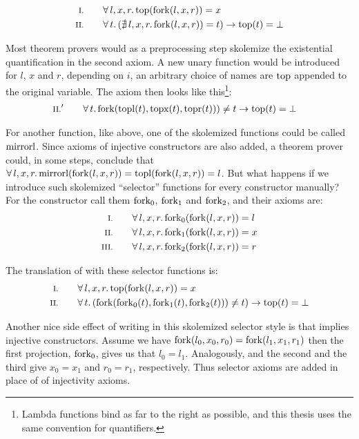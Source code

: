 \begin{align*}
\rom{1} \qquad & \faaa{l}{x}{r} \fn{top}(\fn{fork}(l,x,r)) \eq x \\
\rom{2} \qquad & \fa{t}         (\nexxx{l}{x}{r} \fn{fork}(l,x,r)) \eq t) \rightarrow \fn{top}(t) \eq \bot
\end{align*}

Most theorem provers would as a preprocessing step skolemize the existential quantification in the second
axiom. A new unary function would be introduced for $l$, $x$ and $r$,
depending on $i$, an arbitrary choice of names are $\mathrm{top}$ appended
to the original variable. The axiom then looks like
this\footnote{Lambda functions bind as far to the right as possible,
  and this thesis uses the same convention for quantifiers.}:
\begin{align*}
\rom{2}' \qquad & \fa{t} \fn{fork}(\fn{topl}(t),\fn{topx}(t),\fn{topr}(t))) \neq t \rightarrow \fn{top}(t) \eq \bot
\end{align*}

For another function, like  above, one of the skolemized
functions could be called $\mathrm{mirrorl}$. Since axioms of injective
constructors are also added, a theorem prover could, in some steps,
conclude that $\forall \, l , x , r . \, \mathrm{mirrorl}(\mathrm{fork}(l,x,r)) =
\mathrm{topl}(\mathrm{fork}(l,x,r)) = l$. But what happens if we introduce
such skolemized ``selector'' functions for every constructor manually?
For the  constructor call them $\mathrm{fork_0}$, $\mathrm{fork_1}$
and $\mathrm{fork_2}$, and their axioms are:
\begin{align*}
\rom{1} \qquad \faaa{l}{x}{r} \fn{fork_{0}}(\fn{fork}(l,x,r)) & \eq l\\
\rom{2} \qquad \faaa{l}{x}{r} \fn{fork_{1}}(\fn{fork}(l,x,r)) & \eq x\\
\rom{3} \qquad \faaa{l}{x}{r} \fn{fork_{2}}(\fn{fork}(l,x,r)) & \eq r
\end{align*}

\noindent
The translation of  with these selector functions is:
\begin{align*}
\rom{1} \qquad & \faaa{l}{x}{r} \fn{top}(\fn{fork}(l,x,r)) \eq x \\
\rom{2} \qquad & \fa{t}         (\fn{fork}(\fn{fork_0}(t),\fn{fork_1}(t),\fn{fork_2}(t))) \neq t) \rightarrow \fn{top}(t) \eq \bot
\end{align*}

\noindent
Another nice side effect of writing in this skolemized selector style
is that implies injective constructors. Assume we have
$\mathrm{fork}(l_0,x_0,r_0)=\mathrm{fork}(l_1,x_1,r_1)$ then the first
projection, $\mathrm{fork_0}$, gives us that $l_0=l_1$. Analogously, and
the second and the third give $x_0=x_1$ and $r_0=r_1$,
respectively. Thus selector axioms are added in place of of
injectivity axioms.

